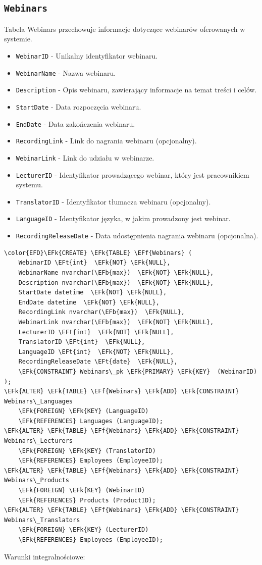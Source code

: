 \documentclass[11pt]{article}
\newcommand{\EFk}[1]{\textcolor{EFk}{\textbf{#1}}} %
\newcommand{\EFb}[1]{\textcolor{EFb}{\textbf{#1}}} %
\newcommand{\EFf}[1]{\textcolor{EFf}{#1}} %
\newcommand{\EFt}[1]{\textcolor{EFt}{\textbf{#1}}} %
\begin{document}
\subsection{\texttt{Webinars}}
\label{sec:org3b0c4a2}
Tabela Webinars przechowuje informacje dotyczące webinarów oferowanych w systemie.
\begin{itemize}
\item \texttt{WebinarID} - Unikalny identyfikator webinaru.
\item \texttt{WebinarName} - Nazwa webinaru.
\item \texttt{Description} - Opis webinaru, zawierający informacje na temat treści i celów.
\item \texttt{StartDate} - Data rozpoczęcia webinaru.
\item \texttt{EndDate} - Data zakończenia webinaru.
\item \texttt{RecordingLink} - Link do nagrania webinaru (opcjonalny).
\item \texttt{WebinarLink} - Link do udziału w webinarze.
\item \texttt{LecturerID} - Identyfikator prowadzącego webinar, który jest pracownikiem systemu.
\item \texttt{TranslatorID} - Identyfikator tłumacza webinaru (opcjonalny).
\item \texttt{LanguageID} - Identyfikator języka, w jakim prowadzony jest webinar.
\item \texttt{RecordingReleaseDate} - Data udostępnienia nagrania webinaru (opcjonalna).
\end{itemize}
\begin{Code}
\begin{Verbatim}
\color{EFD}\EFk{CREATE} \EFk{TABLE} \EFf{Webinars} (
    WebinarID \EFt{int}  \EFk{NOT} \EFk{NULL},
    WebinarName nvarchar(\EFb{max})  \EFk{NOT} \EFk{NULL},
    Description nvarchar(\EFb{max})  \EFk{NOT} \EFk{NULL},
    StartDate datetime  \EFk{NOT} \EFk{NULL},
    EndDate datetime  \EFk{NOT} \EFk{NULL},
    RecordingLink nvarchar(\EFb{max})  \EFk{NULL},
    WebinarLink nvarchar(\EFb{max})  \EFk{NOT} \EFk{NULL},
    LecturerID \EFt{int}  \EFk{NOT} \EFk{NULL},
    TranslatorID \EFt{int}  \EFk{NULL},
    LanguageID \EFt{int}  \EFk{NOT} \EFk{NULL},
    RecordingReleaseDate \EFt{date}  \EFk{NULL},
    \EFk{CONSTRAINT} Webinars\_pk \EFk{PRIMARY} \EFk{KEY}  (WebinarID)
);
\EFk{ALTER} \EFk{TABLE} \EFf{Webinars} \EFk{ADD} \EFk{CONSTRAINT} Webinars\_Languages
    \EFk{FOREIGN} \EFk{KEY} (LanguageID)
    \EFk{REFERENCES} Languages (LanguageID);
\EFk{ALTER} \EFk{TABLE} \EFf{Webinars} \EFk{ADD} \EFk{CONSTRAINT} Webinars\_Lecturers
    \EFk{FOREIGN} \EFk{KEY} (TranslatorID)
    \EFk{REFERENCES} Employees (EmployeeID);
\EFk{ALTER} \EFk{TABLE} \EFf{Webinars} \EFk{ADD} \EFk{CONSTRAINT} Webinars\_Products
    \EFk{FOREIGN} \EFk{KEY} (WebinarID)
    \EFk{REFERENCES} Products (ProductID);
\EFk{ALTER} \EFk{TABLE} \EFf{Webinars} \EFk{ADD} \EFk{CONSTRAINT} Webinars\_Translators
    \EFk{FOREIGN} \EFk{KEY} (LecturerID)
    \EFk{REFERENCES} Employees (EmployeeID);
\end{Verbatim}
\end{Code}
Warunki integralnościowe:
\end{document}
